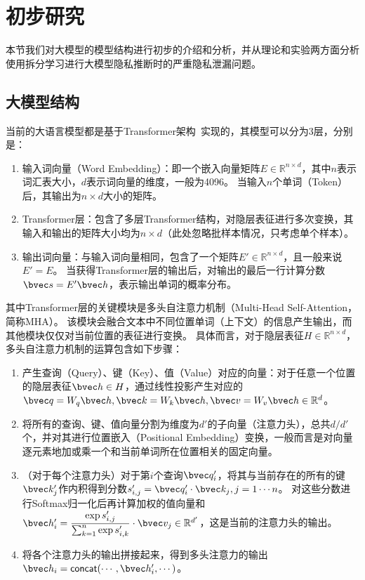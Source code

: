 \section{初步研究}
本节我们对大模型的模型结构进行初步的介绍和分析，并从理论和实验两方面分析使用拆分学习进行大模型隐私推断时的严重隐私泄漏问题。

\subsection{大模型结构}
当前的大语言模型都是基于Transformer架构~\cite{vaswani_2017_attention}实现的，其模型可以分为3层，分别是：
\begin{enumerate}[label=(\arabic*)]
    \item 输入词向量（Word Embedding）：即一个嵌入向量矩阵$E \in \mathbb R^{n\times d}$，其中$n$表示词汇表大小，$d$表示词向量的维度，一般为4096。
    当输入$n$个单词（Token）后，其输出为$n \times d$大小的矩阵。
    \item Transformer层：包含了多层Transformer结构，对隐层表征进行多次变换，其输入和输出的矩阵大小均为$n \times d$（此处忽略批样本情况，只考虑单个样本）。
    \item 输出词向量：与输入词向量相同，包含了一个矩阵$E' \in \mathbb R^{n\times d}$，且一般来说$E' = E$。
    当获得Transformer层的输出后，对输出的最后一行计算分数$\bvec  s = E'\bvec h$，表示输出单词的概率分布。
\end{enumerate}

其中Transformer层的关键模块是多头自注意力机制（Multi-Head Self-Attention，简称MHA）。
%
该模块会融合文本中不同位置单词（上下文）的信息产生输出，而其他模块仅仅对当前位置的表征进行变换。
%
具体而言，对于隐层表征$H \in \mathbb R^{n\times d}$，多头自注意力机制的运算包含如下步骤：
\begin{enumerate}[label=(\arabic*)]
    \item 产生查询（Query）、键（Key）、值（Value）对应的向量：对于任意一个位置的隐层表征$\bvec h \in H$，通过线性投影产生对应的$\bvec q = W_q \bvec h, \bvec k = W_k \bvec h, \bvec v = W_v \bvec h \in \mathbb R^d$。
    \item 将所有的查询、键、值向量分割为维度为$d'$的子向量（注意力头），总共$d/d'$个，并对其进行位置嵌入（Positional Embedding）变换，一般而言是对向量逐元素地加或乘一个和当前单词所在位置相关的固定向量。
    \item （对于每个注意力头）对于第$i$个查询$\bvec q_i'$，将其与当前存在的所有的键$\bvec k'_j$作内积得到分数$s'_{i, j} = \bvec q_i' \cdot \bvec k_j, j = 1\cdots n$。
    对这些分数进行Softmax归一化后再计算加权的值向量和 $\bvec h'_i = \dfrac{\exp {s'_{i, j}}}{\sum_{k = 1}^n \exp {s'_{i, k}}} \cdot \bvec v_j \in \mathbb R^{d'}$，这是当前的注意力头的输出。
    \item 将各个注意力头的输出拼接起来，得到多头注意力的输出$\bvec h_i = \mathsf{concat}(\cdots, \bvec h'_i, \cdots)$。
\end{enumerate}

